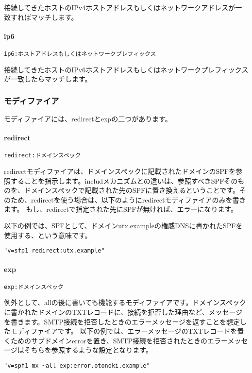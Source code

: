 接続してきたホストのIPv4ホストアドレスもしくはネットワークアドレスが一致すればマッチします。

\paragraph{ip6}
\begin{verbatim}
ip6:ホストアドレスもしくはネットワークプレフィックス
\end{verbatim}
接続してきたホストのIPv6ホストアドレスもしくはネットワークプレフィックスが一致したらマッチします。


\subsubsection{モディファイア}
モディファイアには、redirectとexpの二つがあります。

\paragraph{redirect}
\begin{verbatim}
redirect:ドメインスペック
\end{verbatim}

redirectモディファイアは、ドメインスペックに記載されたドメインのSPFを参照することを指示します。includメカニズムとの違いは、参照すべきSPFそのものを、ドメインスペックで記載された先のSPFに置き換えるということです。そのため、redirectを使う場合は、以下のようにredirectモディファイアのみを書きます。
もし、redirectで指定された先にSPFが無ければ、エラーになります。

以下の例では、SPFとして、ドメインutx.exampleの権威DNSに書かれたSPFを使用する、という意味です。
\begin{verbatim}
"v=sfp1 redirect:utx.example"
\end{verbatim}

\paragraph{exp}
\begin{verbatim}
exp:ドメインスペック
\end{verbatim}

例外として、allの後に書いても機能するモディファイアです。ドメインスペックに書かれたドメインのTXTレコードに、接続を拒否した理由など、メッセージを書きます。SMTP接続を拒否したときのエラーメッセージを返すことを想定したモディファイアです。
以下の例では、エラーメッセージのTXTレコードを置くためのサブドメインerrorを置き、SMTP接続を拒否されたときのエラーメッセージはそちらを参照するような設定となります。

\begin{verbatim}
"v=spf1 mx ~all exp:error.otonoki.example"
\end{verbatim}